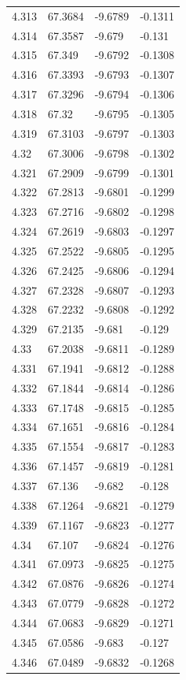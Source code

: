 \begin{tabular}{llll}
4.313 & 67.3684 & -9.6789 & -0.1311 \\
4.314 & 67.3587 & -9.679 & -0.131 \\
4.315 & 67.349 & -9.6792 & -0.1308 \\
4.316 & 67.3393 & -9.6793 & -0.1307 \\
4.317 & 67.3296 & -9.6794 & -0.1306 \\
4.318 & 67.32 & -9.6795 & -0.1305 \\
4.319 & 67.3103 & -9.6797 & -0.1303 \\
4.32 & 67.3006 & -9.6798 & -0.1302 \\
4.321 & 67.2909 & -9.6799 & -0.1301 \\
4.322 & 67.2813 & -9.6801 & -0.1299 \\
4.323 & 67.2716 & -9.6802 & -0.1298 \\
4.324 & 67.2619 & -9.6803 & -0.1297 \\
4.325 & 67.2522 & -9.6805 & -0.1295 \\
4.326 & 67.2425 & -9.6806 & -0.1294 \\
4.327 & 67.2328 & -9.6807 & -0.1293 \\
4.328 & 67.2232 & -9.6808 & -0.1292 \\
4.329 & 67.2135 & -9.681 & -0.129 \\
4.33 & 67.2038 & -9.6811 & -0.1289 \\
4.331 & 67.1941 & -9.6812 & -0.1288 \\
4.332 & 67.1844 & -9.6814 & -0.1286 \\
4.333 & 67.1748 & -9.6815 & -0.1285 \\
4.334 & 67.1651 & -9.6816 & -0.1284 \\
4.335 & 67.1554 & -9.6817 & -0.1283 \\
4.336 & 67.1457 & -9.6819 & -0.1281 \\
4.337 & 67.136 & -9.682 & -0.128 \\
4.338 & 67.1264 & -9.6821 & -0.1279 \\
4.339 & 67.1167 & -9.6823 & -0.1277 \\
4.34 & 67.107 & -9.6824 & -0.1276 \\
4.341 & 67.0973 & -9.6825 & -0.1275 \\
4.342 & 67.0876 & -9.6826 & -0.1274 \\
4.343 & 67.0779 & -9.6828 & -0.1272 \\
4.344 & 67.0683 & -9.6829 & -0.1271 \\
4.345 & 67.0586 & -9.683 & -0.127 \\
4.346 & 67.0489 & -9.6832 & -0.1268 \\

\end{tabular}
